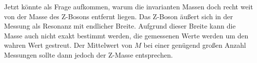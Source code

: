 Jetzt könnte als Frage aufkommen, warum die invarianten Massen doch recht weit von der Masse des Z-Bosons entfernt liegen.
Das Z-Boson äußert sich in der Messung als Resonanz mit endlicher Breite.
Aufgrund dieser Breite kann die Masse auch nicht exakt bestimmt werden, die gemessenen Werte werden um den wahren Wert gestreut.
Der Mittelwert von $M$ bei einer genügend großen Anzahl Messungen sollte dann jedoch der Z-Masse entsprechen.
\clearpage